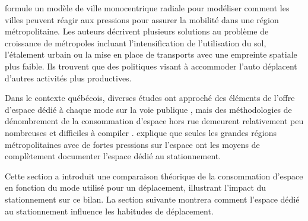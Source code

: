         \textcite{shin_land_2009} formule un modèle de ville monocentrique radiale pour modéliser comment les villes peuvent réagir aux pressions pour assurer la mobilité dans une région métropolitaine. Les auteurs décrivent plusieurs solutions au problème de croissance de métropoles incluant l'intensification de l'utilisation du sol, l'étalement urbain ou la mise en place de transports avec une empreinte spatiale plus faible. Ils trouvent que des politiques visant à accommoder l'auto déplacent d'autres activités plus productives.\par
        Dans le contexte québécois, diverses études ont approché des éléments de l'offre d'espace dédié à chaque mode sur la voie publique \parencite{lefebvre-ropars_methodologie_2021,bourdeau_methodologie_2014}, mais des méthodologies de dénombrement de la consommation d'espace hors rue demeurent relativement peu nombreuses et difficiles à compiler \parencite{morency_stationnement_2017}.\textcite{heran_consommation_2008} explique que seules les grandes régions métropolitaines avec de fortes pressions sur l'espace ont les moyens de complètement documenter l'espace dédié au stationnement.\par
        Cette section a introduit une comparaison théorique de la consommation d'espace en fonction du mode utilisé pour un déplacement, illustrant l'impact du stationnement sur ce bilan. La section suivante montrera comment l'espace dédié au stationnement influence les habitudes de déplacement.
    
    
